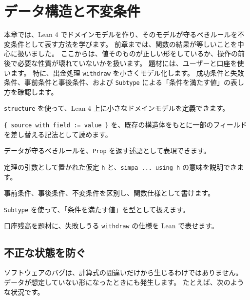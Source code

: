 \chapter{データ構造と不変条件}
\label{chap:ch10_invariants}

\begin{chapterabstract}
本章では、Lean 4 でドメインモデルを作り、そのモデルが守るべきルールを不変条件として表す方法を学びます。
前章までは、関数の結果が等しいことを中心に扱いました。
ここからは、値そのものが正しい形をしているか、操作の前後で必要な性質が壊れていないかを扱います。
題材には、ユーザーと口座を使います。
特に、出金処理 \texttt{withdraw} を小さくモデル化します。
成功条件と失敗条件、事前条件と事後条件、および \texttt{Subtype} による「条件を満たす値」の表し方を確認します。
\end{chapterabstract}

\begin{learninggoals}
\item \texttt{structure} を使って、Lean 4 上に小さなドメインモデルを定義できます。
\item \texttt{\{ source with field := value \}} を、既存の構造体をもとに一部のフィールドを差し替える記法として読めます。
\item データが守るべきルールを、\texttt{Prop} を返す述語として表現できます。
\item 定理の引数として置かれた仮定 \texttt{h} と、\texttt{simpa ... using h} の意味を説明できます。
\item 事前条件、事後条件、不変条件を区別し、関数仕様として書けます。
\item \texttt{Subtype} を使って、「条件を満たす値」を型として扱えます。
\item 口座残高を題材に、失敗しうる \texttt{withdraw} の仕様を Lean で表せます。
\end{learninggoals}

\section{不正な状態を防ぐ}

ソフトウェアのバグは、計算式の間違いだけから生じるわけではありません。
データが想定していない形になったときにも発生します。
たとえば、次のような状況です。

